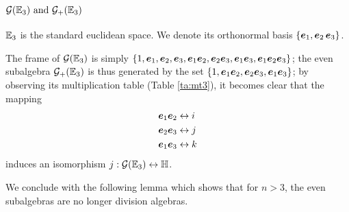 \subsection{$\G(\E_3)\ \mathrm{and}\ \G_+(\E_3)$}
$\mathbb{E}_3$ is the standard euclidean space. We denote its orthonormal basis $\{\boldsymbol{e}_1, \boldsymbol{e}_2\, \boldsymbol{e}_3\}$.

The frame of $\mathcal{G}(\mathbb{E}_3)$ is simply $\{1, \boldsymbol{e}_1, \boldsymbol{e}_2, \boldsymbol{e}_3, \boldsymbol{e}_1\boldsymbol{e}_2, \boldsymbol{e}_2\boldsymbol{e}_3, \boldsymbol{e}_1\boldsymbol{e}_3, \boldsymbol{e}_1\boldsymbol{e}_2\boldsymbol{e}_3\}$; the even subalgebra $\mathcal{G}_+(\mathbb{E}_3)$ is thus generated by the set $\{1, \boldsymbol{e}_1\boldsymbol{e}_2, \boldsymbol{e}_2\boldsymbol{e}_3, \boldsymbol{e}_1\boldsymbol{e}_3\}$; by observing its multiplication table (Table \ref{ta:mt3}), it becomes clear that the mapping
\begin{align*}
	&\boldsymbol{e}_1\boldsymbol{e}_2 \leftrightarrow i \\
	&\boldsymbol{e}_2\boldsymbol{e}_3 \leftrightarrow j \\
	&\boldsymbol{e}_1\boldsymbol{e}_3 \leftrightarrow k 
\end{align*}
induces an isomorphism $j : \mathcal{G}(\mathbb{E}_3) \leftrightarrow \mathbb{H}$.



We conclude with the following lemma which shows that for $n > 3$, the even subalgebras are no longer division algebras.




